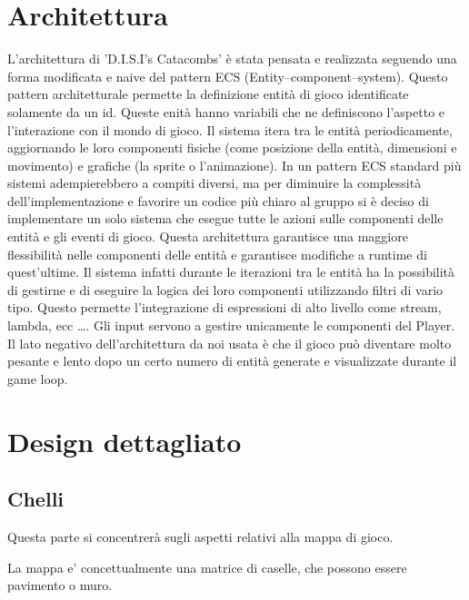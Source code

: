 \documentclass[a4paper,12pt]{report}
\begin{document}
    \section{Architettura}
    \par L'architettura di 'D.I.S.I's Catacombs' è stata pensata e realizzata seguendo una forma modificata e naive del pattern ECS (Entity–component–system).
    Questo pattern architetturale permette la definizione entità di gioco identificate solamente da un id.
    Queste enità hanno variabili che ne definiscono l'aspetto e l'interazione con il mondo di gioco.
    Il sistema itera tra le entità periodicamente, aggiornando le loro componenti fisiche (come posizione della entità, dimensioni e movimento)
    e grafiche (la sprite o l'animazione).
    In un pattern ECS standard più sistemi adempierebbero a compiti diversi, ma per diminuire la complessità dell'implementazione e favorire
    un codice più chiaro al gruppo si è deciso di implementare un solo sistema che esegue tutte le azioni sulle componenti delle entità e gli eventi di gioco.
    Questa architettura garantisce una maggiore flessibilità nelle componenti delle entità e garantisce modifiche a runtime di quest'ultime.
    Il sistema infatti durante le iterazioni tra le entità ha la possibilità di gestirne e di eseguire la logica dei loro componenti utilizzando filtri di
    vario tipo.
    Questo permette l'integrazione di espressioni di alto livello come stream, lambda, ecc \ldots.
    Gli input servono a gestire unicamente le componenti del Player.
    Il lato negativo dell'architettura da noi usata è che il gioco può diventare molto pesante e lento dopo un certo numero di entità generate e visualizzate
    durante il game loop.
    \section{Design dettagliato}
    \subsection{Chelli}
    \par Questa parte si concentrerà sugli aspetti relativi alla mappa di gioco.
    \par
    \par La mappa e' concettualmente una matrice di caselle, che possono essere pavimento o muro.
\end{document}
